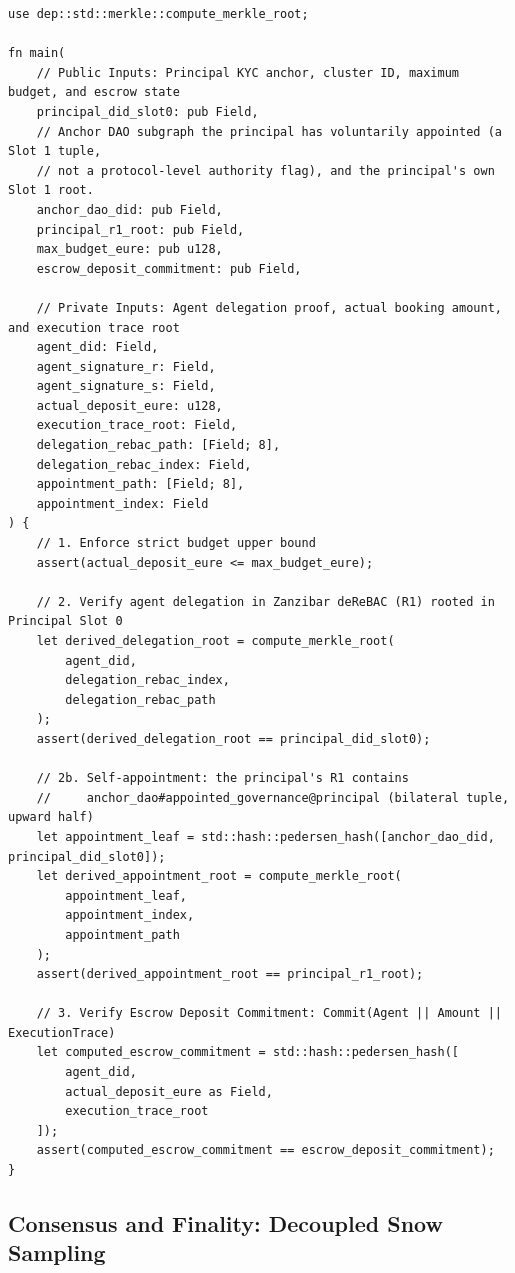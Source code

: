 \documentclass[a4paper,11pt,twoside,parskip=half-,headings=small]{scrartcl}
\newcommand{\code}[1]{\texttt{#1}}
\begin{document}
\clearpage
{}
\begin{lstlisting}[language=Noir,caption={Noir Circuit: Autonomous AI Agent Budget and vServer Allocation Verifier (\code{circuits/src/agent\_vserver\_escrow.nr})}]
use dep::std::merkle::compute_merkle_root;

fn main(
    // Public Inputs: Principal KYC anchor, cluster ID, maximum budget, and escrow state
    principal_did_slot0: pub Field,
    // Anchor DAO subgraph the principal has voluntarily appointed (a Slot 1 tuple,
    // not a protocol-level authority flag), and the principal's own Slot 1 root.
    anchor_dao_did: pub Field,
    principal_r1_root: pub Field,
    max_budget_eure: pub u128,
    escrow_deposit_commitment: pub Field,
    
    // Private Inputs: Agent delegation proof, actual booking amount, and execution trace root
    agent_did: Field,
    agent_signature_r: Field,
    agent_signature_s: Field,
    actual_deposit_eure: u128,
    execution_trace_root: Field,
    delegation_rebac_path: [Field; 8],
    delegation_rebac_index: Field,
    appointment_path: [Field; 8],
    appointment_index: Field
) {
    // 1. Enforce strict budget upper bound
    assert(actual_deposit_eure <= max_budget_eure);

    // 2. Verify agent delegation in Zanzibar deReBAC (R1) rooted in Principal Slot 0
    let derived_delegation_root = compute_merkle_root(
        agent_did,
        delegation_rebac_index,
        delegation_rebac_path
    );
    assert(derived_delegation_root == principal_did_slot0);

    // 2b. Self-appointment: the principal's R1 contains
    //     anchor_dao#appointed_governance@principal (bilateral tuple, upward half)
    let appointment_leaf = std::hash::pedersen_hash([anchor_dao_did, principal_did_slot0]);
    let derived_appointment_root = compute_merkle_root(
        appointment_leaf,
        appointment_index,
        appointment_path
    );
    assert(derived_appointment_root == principal_r1_root);

    // 3. Verify Escrow Deposit Commitment: Commit(Agent || Amount || ExecutionTrace)
    let computed_escrow_commitment = std::hash::pedersen_hash([
        agent_did,
        actual_deposit_eure as Field,
        execution_trace_root
    ]);
    assert(computed_escrow_commitment == escrow_deposit_commitment);
}
\end{lstlisting}

\clearpage
\subsection{Consensus and Finality: Decoupled Snow Sampling}
\label{sec:consensus_snow}
\end{document}

